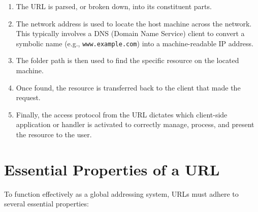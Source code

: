 \documentclass{scrbook}
\begin{document}
\begin{enumerate}
    \item
    The URL is parsed, or broken down, into its constituent parts.

    \item
    The network address is used to locate the host machine across the network. This typically involves a DNS (Domain Name Service) client to convert a symbolic name (e.g., \texttt{www.example.com}) into a machine-readable IP address.

    \item
    The folder path is then used to find the specific resource on the located machine.

    \item
    Once found, the resource is transferred back to the client that made the request.

    \item
    Finally, the access protocol from the URL dictates which client-side application or handler is activated to correctly manage, process, and present the resource to the user.
\end{enumerate}

\section{Essential Properties of a URL}

To function effectively as a global addressing system, URLs must adhere to several essential properties:
\end{document}
